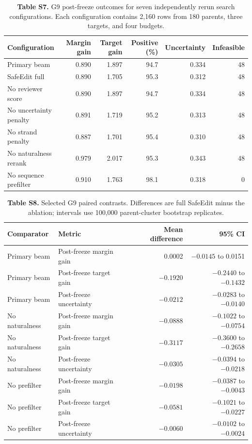 \documentclass[10pt,a4paper]{article}
\begin{document}
\begin{table}[ht]
\centering
\caption{\textbf{Table S7.} G9 post-freeze outcomes for seven independently rerun search configurations.
Each configuration contains 2,160 rows from 180 parents, three targets, and four
budgets.}
\label{tab:S7}
\begin{tabular}{lrrrrr}
\toprule
Configuration & Margin gain & Target gain & Positive (\%) & Uncertainty & Infeasible \\
\midrule
Primary beam & 0.890 & 1.897 & 94.7 & 0.334 & 48 \\
SafeEdit full & 0.890 & 1.705 & 95.3 & 0.312 & 48 \\
No reviewer score & 0.890 & 1.897 & 94.7 & 0.334 & 48 \\
No uncertainty penalty & 0.891 & 1.719 & 95.2 & 0.313 & 48 \\
No strand penalty & 0.887 & 1.701 & 95.4 & 0.310 & 48 \\
No naturalness rerank & 0.979 & 2.017 & 95.3 & 0.343 & 48 \\
No sequence prefilter & 0.910 & 1.763 & 98.1 & 0.318 & 0 \\
\bottomrule
\end{tabular}
\end{table}

\begin{table}[ht]
\centering
\caption{\textbf{Table S8.} Selected G9 paired contrasts. Differences are full SafeEdit minus the
ablation; intervals use 100,000 parent-cluster bootstrap replicates.}
\label{tab:S8}
\begin{tabular}{llrr}
\toprule
Comparator & Metric & Mean difference & 95\% CI \\
\midrule
Primary beam & Post-freeze margin gain & 0.0002 & $-0.0145$ to 0.0151 \\
Primary beam & Post-freeze target gain & $-0.1920$ & $-0.2440$ to $-0.1432$ \\
Primary beam & Post-freeze uncertainty & $-0.0212$ & $-0.0283$ to $-0.0140$ \\
\addlinespace
No naturalness & Post-freeze margin gain & $-0.0888$ & $-0.1022$ to $-0.0754$ \\
No naturalness & Post-freeze target gain & $-0.3117$ & $-0.3600$ to $-0.2658$ \\
No naturalness & Post-freeze uncertainty & $-0.0305$ & $-0.0394$ to $-0.0218$ \\
\addlinespace
No prefilter & Post-freeze margin gain & $-0.0198$ & $-0.0387$ to $-0.0043$ \\
No prefilter & Post-freeze target gain & $-0.0581$ & $-0.1021$ to $-0.0227$ \\
No prefilter & Post-freeze uncertainty & $-0.0060$ & $-0.0102$ to $-0.0024$ \\
\bottomrule
\end{tabular}
\end{table}
\end{document}
